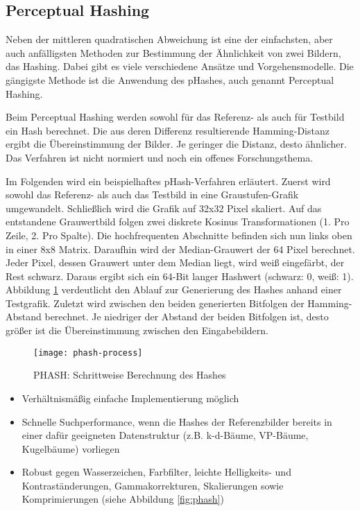 \subsection{Perceptual Hashing}
Neben der mittleren quadratischen Abweichung ist eine der einfachsten, aber auch
anfälligsten Methoden zur Bestimmung der Ähnlichkeit von zwei Bildern, das
Hashing. Dabei gibt es viele verschiedene Ansätze und Vorgehensmodelle. Die
gängigste Methode ist die Anwendung des pHashes, auch genannt Perceptual Hashing.
\parencite{hashing-apiumhub}

Beim Perceptual Hashing werden sowohl für das Referenz- als auch für Testbild
ein Hash berechnet. Die aus deren Differenz resultierende Hamming-Distanz ergibt
die Übereinstimmung der Bilder. Je geringer die Distanz, desto ähnlicher. Das
Verfahren ist nicht normiert und noch ein offenes Forschungsthema.
\parencite{hashing-phash}

Im Folgenden wird ein beispielhaftes pHash-Verfahren erläutert. Zuerst wird
sowohl das Referenz- als auch das Testbild in eine Graustufen-Grafik
umgewandelt. Schließlich wird die Grafik auf 32x32 Pixel skaliert. Auf das
entstandene Grauwertbild folgen zwei diskrete Kosinus Transformationen (1. Pro
Zeile, 2. Pro Spalte). Die hochfrequenten Abschnitte befinden sich nun links
oben in einer 8x8 Matrix. Daraufhin wird der Median-Grauwert der 64 Pixel
berechnet. Jeder Pixel, dessen Grauwert unter dem Median liegt, wird weiß
eingefärbt, der Rest schwarz. Daraus ergibt sich ein 64-Bit langer Hashwert
(schwarz: 0, weiß: 1). Abbildung \ref{fig:phash-process} verdeutlicht den 
Ablauf zur Generierung des Hashes anhand einer Testgrafik. Zuletzt wird zwischen
den beiden generierten Bitfolgen der Hamming-Abstand berechnet. Je niedriger der
Abstand der beiden Bitfolgen ist, desto größer ist die Übereinstimmung zwischen
den Eingabebildern. \parencite{hashing-apiumhub}

\begin{figure}[H]
    \centering
    \texttt{[image: phash-process]}
    \caption{PHASH: Schrittweise Berechnung des Hashes}
    \label{fig:phash-process}
\end{figure}

\begin{itemize}[topsep=0pt]
    \item Verhältnismäßig einfache Implementierung möglich
    \item Schnelle Suchperformance, wenn die Hashes der Referenzbilder bereits
    in einer dafür geeigneten Datenstruktur (z.B. k-d-Bäume, VP-Bäume,
    Kugelbäume) vorliegen \parencite{hashing-lvngd}
    \item Robust gegen Wasserzeichen, Farbfilter, leichte Helligkeits- und
    Kontraständerungen, Gammakorrekturen, Skalierungen sowie Komprimierungen
    (siehe Abbildung \ref{fig:phash})
    \parencite{hashing-phash}
\end{itemize}

